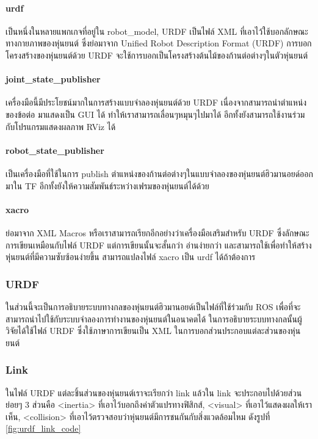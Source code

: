 \paragraph*{urdf}
เป็นหนึ่งในหลายแพกเกจที่อยู่ใน robot\_model, URDF เป็นไฟล์ XML ที่เอาไว้ใช้บอกลักษณะทางกายภาพของหุ่นยนต์ ซึ่งย่อมาจาก Unified Robot Description Format (URDF)
การบอกโครงสร้างของหุ่นยนต์ด้วย URDF จะใช้การบอกเป็นโครงสร้างต้นไม้ของก้านต่อต่างๆในตัวหุ่นยนต์

\paragraph*{joint\_state\_publisher}
เครื่องมือนี้มีประโยชน์มากในการสร้างแบบจำลองหุ่นยนต์ด้วย URDF เนื่องจากสามารถนำตำแหน่งของข้อต่อ มาแสดงเป็น GUI ได้ ทำให้เราสามารถเลื่อนๆหมุนๆไปมาได้ อีกทั้งยังสามารถใช้งานร่วมกับโปรแกรมแสดงผลภาพ RViz ได้

\paragraph*{robot\_state\_publisher}
เป็นเครื่องมือที่ใช้ในการ publish ตำแหน่งของก้านต่อต่างๆในแบบจำลองของหุ่นยนต์ฮิวมานอยด์ออกมาใน TF อีกทั้งยังให้ความสัมพันธ์ระหว่างเฟรมของหุ่นยนต์ได้ด้วย

\paragraph*{xacro}
ย่อมาจาก XML Macros หรือเราสามารถเรียกอีกอย่างว่าเครื่องมือเสริมสำหรับ URDF ซึ่งลักษณะการเขียนเหมือนกับไฟล์ URDF แต่การเขียนนั้นจะสั้นกว่า อ่านง่ายกว่า และสามารถใช้เพื่อทำให้สร้างหุ่นยนต์ที่มีความซับซ้อนง่ายขึ้น
สามารถแปลงไฟล์ xacro เป็น urdf ได้ถ้าต้องการ

\vspace{20pt}
\subsubsection{URDF}
ในส่วนนี้จะเป็นการอธิบายระบบทางกลของหุ่นยนต์ฮิวมานอยด์เป็นไฟล์ที่ใช้ร่วมกับ ROS
เพื่อที่จะสามารถนำไปใช้กับระบบจำลองการทำงานของหุ่นยนต์ในอนาคตได้
ในการอธิบายระบบทางกลนั้นผู้วิจัยได้ใช้ไฟล์ URDF ซึ่งใช้ภาษาการเขียนเป็น XML ในการบอกส่วนประกอบแต่ละส่วนของหุ่นยนต์

\subsubsection*{Link}
ในไฟล์ URDF แต่ละชิ้นส่วนของหุ่นยนต์เราจะเรียกว่า link แล้วใน link จะประกอบไปด้วยส่วนย่อยๆ
3 ส่วนคือ <inertia> ที่เอาไว้บอกถึงค่าตัวแปรทางฟิสิกส์, <visual> ที่เอาไว้แสดงผลให้เราเห็น, 
<collision> ที่เอาไว้ตรวจสอบว่าหุ่นยนต์มีการชนกันกับสิ่งแวดล้อมไหม ดังรูปที่ \ref{fig:urdf_link_code}

